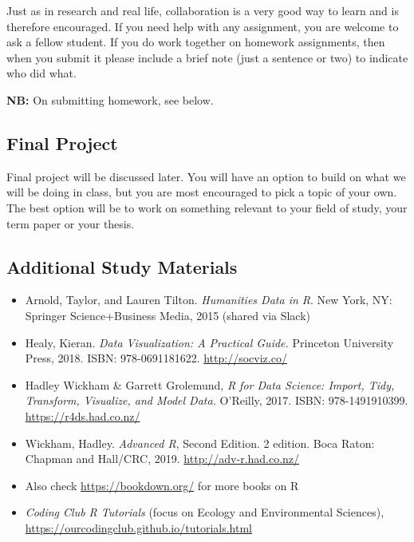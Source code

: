 \documentclass[
]{book}
\providecommand{\tightlist}{%
  \setlength{\itemsep}{0pt}\setlength{\parskip}{0pt}}
\begin{document}
Just as in research and real life, collaboration is a very good way to learn and is therefore encouraged. If you need help with any assignment, you are welcome to ask a fellow student. If you do work together on homework assignments, then when you submit it please include a brief note (just a sentence or two) to indicate who did what.

\textbf{NB:} On submitting homework, see below.

\hypertarget{final-project}{%
\subsection*{Final Project}\label{final-project}}

Final project will be discussed later. You will have an option to build on what we will be doing in class, but you are most encouraged to pick a topic of your own. The best option will be to work on something relevant to your field of study, your term paper or your thesis.

\hypertarget{additional-study-materials}{%
\subsection*{Additional Study Materials}\label{additional-study-materials}}

\begin{itemize}
\tightlist
\item
  Arnold, Taylor, and Lauren Tilton. \emph{Humanities Data in R}. New York, NY: Springer Science+Business Media, 2015 (shared via Slack)
\item
  Healy, Kieran. \emph{Data Visualization: A Practical Guide.} Princeton University Press, 2018. ISBN: 978-0691181622. \url{http://socviz.co/}
\item
  Hadley Wickham \& Garrett Grolemund, \emph{R for Data Science: Import, Tidy, Transform, Visualize, and Model Data.} O'Reilly, 2017. ISBN: 978-1491910399. \url{https://r4ds.had.co.nz/}
\item
  Wickham, Hadley. \emph{Advanced R}, Second Edition. 2 edition. Boca Raton: Chapman and Hall/CRC, 2019. \url{http://adv-r.had.co.nz/}
\item
  Also check \url{https://bookdown.org/} for more books on R
\item
  \emph{Coding Club R Tutorials} (focus on Ecology and Environmental Sciences), \url{https://ourcodingclub.github.io/tutorials.html}
\end{itemize}
\end{document}
